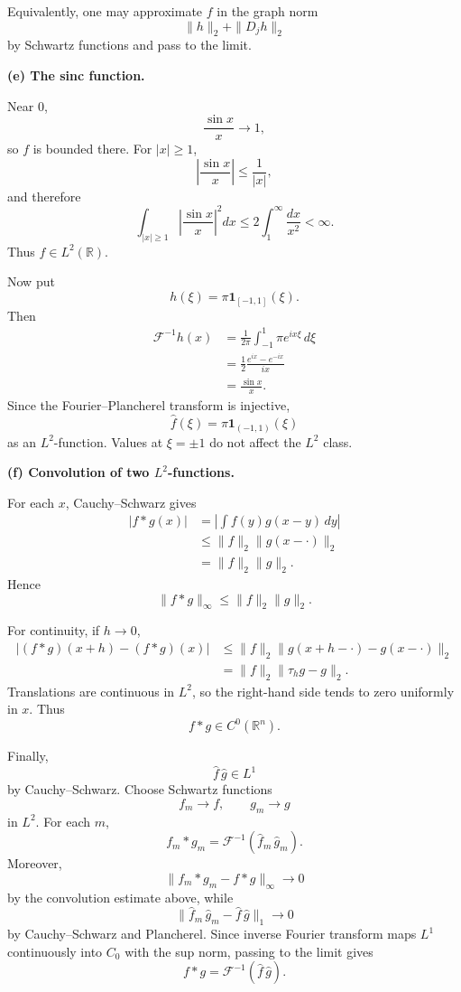 \begin{solution}
Equivalently, one may approximate \(f\) in the graph norm
\[
\|h\|_2+\|D_jh\|_2
\]
by Schwartz functions and pass to the limit.

\par\smallskip\noindent\textbf{(e) The sinc function.}

Near \(0\),
\[
\frac{\sin x}{x}\to1,
\]
so \(f\) is bounded there. For \(|x|\ge1\),
\[
\left|\frac{\sin x}{x}\right|
\le
\frac1{|x|},
\]
and therefore
\[
\int_{|x|\ge1}
\left|\frac{\sin x}{x}\right|^2dx
\le
2\int_1^\infty\frac{dx}{x^2}
<\infty.
\]
Thus \(f\in L^2(\mathbb R)\).

Now put
\[
h(\xi)
=
\pi\mathbf1_{[-1,1]}(\xi).
\]
Then
\[
\begin{aligned}
\mathcal F^{-1}h(x)
&=
\frac1{2\pi}
\int_{-1}^1
\pi e^{ix\xi}\,d\xi\\
&=
\frac12
\frac{e^{ix}-e^{-ix}}{ix}\\
&=
\frac{\sin x}{x}.
\end{aligned}
\]
Since the Fourier--Plancherel transform is injective,
\[
\boxed{
\widehat f(\xi)
=
\pi\mathbf1_{(-1,1)}(\xi)
}
\]
as an \(L^2\)-function. Values at \(\xi=\pm1\) do not affect the \(L^2\)
class.

\par\smallskip\noindent\textbf{(f) Convolution of two \(L^2\)-functions.}

For each \(x\), Cauchy--Schwarz gives
\[
\begin{aligned}
|f*g(x)|
&=
\left|
\int f(y)g(x-y)\,dy
\right|\\
&\le
\|f\|_2
\|g(x-\cdot)\|_2\\
&=
\|f\|_2\|g\|_2.
\end{aligned}
\]
Hence
\[
\boxed{
\|f*g\|_\infty
\le
\|f\|_2\|g\|_2.}
\]

For continuity, if \(h\to0\),
\[
\begin{aligned}
|(f*g)(x+h)-(f*g)(x)|
&\le
\|f\|_2
\|g(x+h-\cdot)-g(x-\cdot)\|_2\\
&=
\|f\|_2
\|\tau_hg-g\|_2.
\end{aligned}
\]
Translations are continuous in \(L^2\), so the right-hand side tends to
zero uniformly in \(x\). Thus
\[
f*g\in C^0(\mathbb R^n).
\]

Finally,
\[
\widehat f\,\widehat g\in L^1
\]
by Cauchy--Schwarz. Choose Schwartz functions
\[
f_m\to f,
\qquad
g_m\to g
\]
in \(L^2\). For each \(m\),
\[
f_m*g_m
=
\mathcal F^{-1}(\widehat f_m\,\widehat g_m).
\]
Moreover,
\[
\|f_m*g_m-f*g\|_\infty\to0
\]
by the convolution estimate above, while
\[
\|\widehat f_m\,\widehat g_m
-
\widehat f\,\widehat g\|_1
\to0
\]
by Cauchy--Schwarz and Plancherel. Since inverse Fourier transform maps
\(L^1\) continuously into \(C_0\) with the sup norm, passing to the limit
gives
\[
\boxed{
f*g
=
\mathcal F^{-1}(\widehat f\,\widehat g).}
\]
\end{solution}


